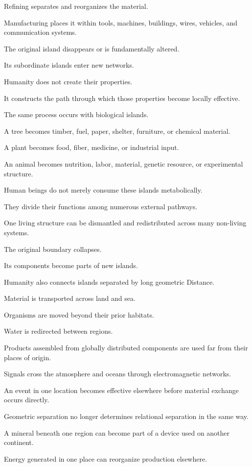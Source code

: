 Refining separates and reorganizes the material.

Manufacturing places it within tools, machines, buildings, wires, vehicles, and communication systems.

The original island disappears or is fundamentally altered.

Its subordinate islands enter new networks.

Humanity does not create their properties.

It constructs the path through which those properties become locally effective.

The same process occurs with biological islands.

A tree becomes timber, fuel, paper, shelter, furniture, or chemical material.

A plant becomes food, fiber, medicine, or industrial input.

An animal becomes nutrition, labor, material, genetic resource, or experimental structure.

Human beings do not merely consume these islands metabolically.

They divide their functions among numerous external pathways.

One living structure can be dismantled and redistributed across many non-living systems.

The original boundary collapses.

Its components become parts of new islands.

Humanity also connects islands separated by long geometric Distance.

Material is transported across land and sea.

Organisms are moved beyond their prior habitats.

Water is redirected between regions.

Products assembled from globally distributed components are used far from their places of origin.

Signals cross the atmosphere and oceans through electromagnetic networks.

An event in one location becomes effective elsewhere before material exchange occurs directly.

Geometric separation no longer determines relational separation in the same way.

A mineral beneath one region can become part of a device used on another continent.

Energy generated in one place can reorganize production elsewhere.


